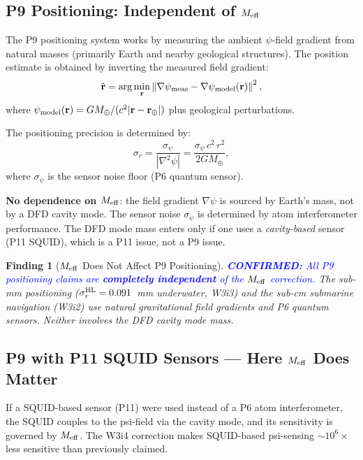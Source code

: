 \documentclass[aps,prd,twocolumn,superscriptaddress,nofootinbib]{revtex4-2}
\newcommand{\confirmed}[1]{\textcolor{blue}{\textbf{CONFIRMED:} #1}}
\newtheorem{finding}{Finding}
\begin{document}
\subsection{P9 Positioning: Independent of $M_{\rm eff}$}

The P9 positioning system works by measuring the ambient $\psi$-field
gradient from natural masses (primarily Earth and nearby geological
structures). The position estimate is obtained by inverting the
measured field gradient:
\begin{equation}
\hat{\mathbf{r}} = \arg\min_{\mathbf{r}}
\left\|\nabla\psi_{\rm meas} - \nabla\psi_{\rm model}(\mathbf{r})\right\|^2,
\label{eq:p9-positioning}
\end{equation}
where $\psi_{\rm model}(\mathbf{r}) = G M_\oplus / (c^2 |\mathbf{r} - \mathbf{r}_\oplus|)$
plus geological perturbations.

The positioning precision is determined by:
\begin{equation}
\sigma_r = \frac{\sigma_\psi}{|\nabla^2\psi|} = \frac{\sigma_\psi\,c^2\,r^2}{2 G M_\oplus},
\label{eq:sigma-r}
\end{equation}
where $\sigma_\psi$ is the sensor noise floor (P6 quantum sensor).

\textbf{No dependence on $M_{\rm eff}$}: the field gradient $\nabla\psi$
is sourced by Earth's mass, not by a DFD cavity mode. The sensor noise
$\sigma_\psi$ is determined by atom interferometer performance. The DFD
mode mass enters only if one uses a \emph{cavity-based} sensor (P11 SQUID),
which is a P11 issue, not a P9 issue.

\begin{finding}[$M_{\rm eff}$ Does Not Affect P9 Positioning]
\label{find:p9-meff}
\confirmed{All P9 positioning claims are \textbf{completely independent}
of the $M_{\rm eff}$ correction.} The sub-mm positioning
($\sigma_r^{\rm HL} = 0.091$~mm underwater, W3i3) and the
sub-cm submarine navigation (W3i2) use natural gravitational
field gradients and P6 quantum sensors. Neither involves
the DFD cavity mode mass.
\end{finding}

\subsection{P9 with P11 SQUID Sensors --- Here $M_{\rm eff}$ Does Matter}

If a SQUID-based sensor (P11) were used instead of a P6 atom
interferometer, the SQUID couples to the psi-field via the cavity
mode, and its sensitivity is governed by $M_{\rm eff}$. The W3i4
correction makes SQUID-based psi-sensing $\sim 10^6\times$ less
sensitive than previously claimed.
\end{document}

